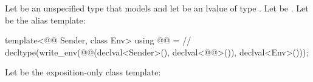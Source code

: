 \pnum
Let  be an unspecified type
that models  and
let  be an lvalue of type .
Let  be .
Let  be the alias template:

\begin{codeblock}
template<@@ Sender, class Env>
using @@ =                                   // \expos
  decltype(write_env(@@(declval<Sender>(), declval<@@>()), declval<Env>()));
\end{codeblock}

\pnum
Let  be the exposition-only class template:

